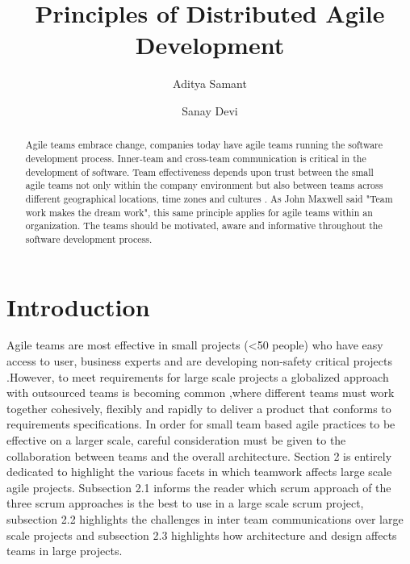 \documentclass[sigplan,screen]{acmart}
\begin{document}
\title{Principles of Distributed Agile Development}
\author{Aditya Samant}
\author{Sanay Devi}


\begin{abstract}
Agile teams embrace change, companies today have agile teams running the software development process. Inner-team and cross-team communication is critical in the development of  software. Team effectiveness depends upon trust between the small agile teams not only within the company environment but also between teams across different geographical locations, time zones and cultures \cite{Siva13}. As John Maxwell said "Team work makes the dream work", this same principle applies for agile teams within an organization. The teams should be motivated, aware and informative throughout the software development process. 
\end{abstract}

\maketitle



\section{Introduction}
Agile teams are most effective in small projects (<50 people) who have easy access to user, business experts and are developing non-safety critical projects \cite{Dingsoyr} .However, to meet requirements for large scale projects a globalized approach with outsourced teams is becoming common \cite{Jeff},where different teams must work together cohesively, flexibly and rapidly to deliver  a product that conforms to requirements specifications. In order for small team based agile practices to be effective on  a larger scale, careful consideration must be given to the collaboration between teams and the overall architecture. Section 2 is entirely dedicated to highlight the various facets in which teamwork affects large scale agile projects. Subsection 2.1 informs the reader which scrum approach of the three scrum approaches \cite{Jeff} is the best to use in a large scale scrum project, subsection 2.2 highlights the challenges in inter team communications over large scale projects and subsection 2.3 highlights how architecture and design affects teams in large projects.
 
\end{document}
